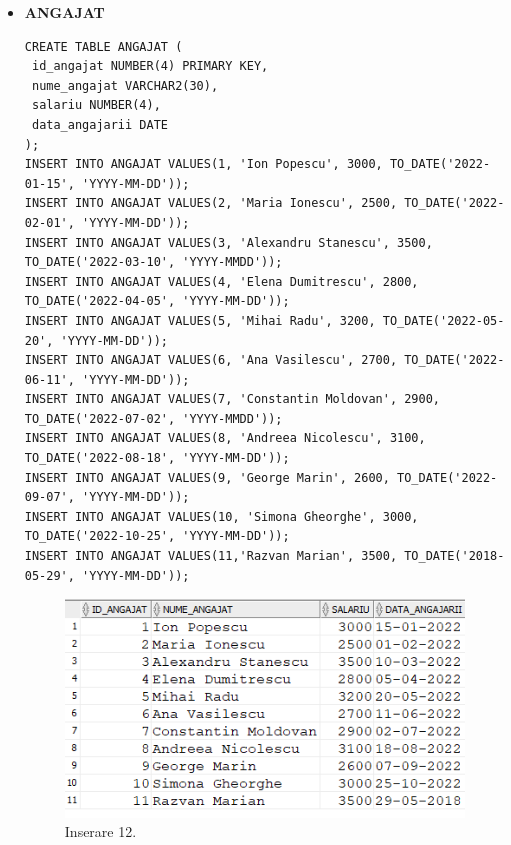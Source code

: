 \begin{itemize}
    \item \textbf{ANGAJAT}
    \vspace{0.2cm}
    \begin{lstlisting}
CREATE TABLE ANGAJAT (
 id_angajat NUMBER(4) PRIMARY KEY,
 nume_angajat VARCHAR2(30),
 salariu NUMBER(4),
 data_angajarii DATE
);
INSERT INTO ANGAJAT VALUES(1, 'Ion Popescu', 3000, TO_DATE('2022-01-15', 'YYYY-MM-DD'));
INSERT INTO ANGAJAT VALUES(2, 'Maria Ionescu', 2500, TO_DATE('2022-02-01', 'YYYY-MM-DD'));
INSERT INTO ANGAJAT VALUES(3, 'Alexandru Stanescu', 3500, TO_DATE('2022-03-10', 'YYYY-MMDD'));
INSERT INTO ANGAJAT VALUES(4, 'Elena Dumitrescu', 2800, TO_DATE('2022-04-05', 'YYYY-MM-DD'));
INSERT INTO ANGAJAT VALUES(5, 'Mihai Radu', 3200, TO_DATE('2022-05-20', 'YYYY-MM-DD'));
INSERT INTO ANGAJAT VALUES(6, 'Ana Vasilescu', 2700, TO_DATE('2022-06-11', 'YYYY-MM-DD'));
INSERT INTO ANGAJAT VALUES(7, 'Constantin Moldovan', 2900, TO_DATE('2022-07-02', 'YYYY-MMDD'));
INSERT INTO ANGAJAT VALUES(8, 'Andreea Nicolescu', 3100, TO_DATE('2022-08-18', 'YYYY-MM-DD'));
INSERT INTO ANGAJAT VALUES(9, 'George Marin', 2600, TO_DATE('2022-09-07', 'YYYY-MM-DD'));
INSERT INTO ANGAJAT VALUES(10, 'Simona Gheorghe', 3000, TO_DATE('2022-10-25', 'YYYY-MM-DD'));
INSERT INTO ANGAJAT VALUES(11,'Razvan Marian', 3500, TO_DATE('2018-05-29', 'YYYY-MM-DD'));
    \end{lstlisting}
    \vspace{0.2cm}
    \begin{figure}[h]
      \centerline{\includegraphics{images/inserare12.png}}
      \caption{ Inserare 12.}
    \end{figure}
    \vspace{0.5cm}


\end{itemize}
